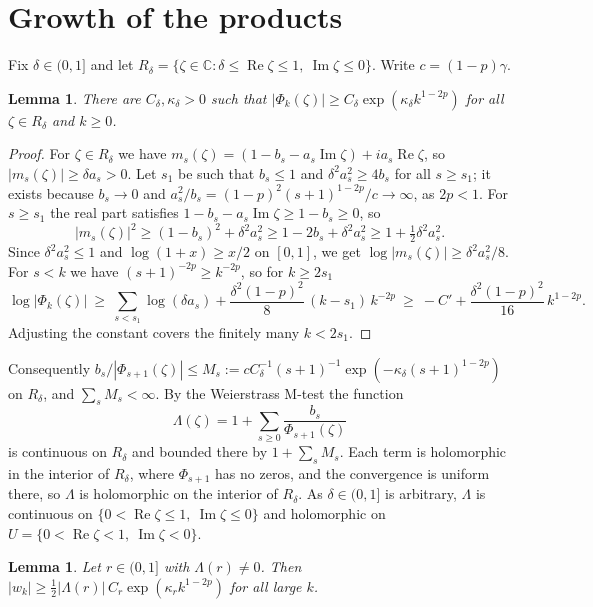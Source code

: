 \documentclass[11pt]{amsart}
\newtheorem{lemma}[theorem]{Lemma}
\theoremstyle{remark}
\newcommand{\C}{\mathbb{C}}
\newcommand{\re}{\operatorname{Re}}
\newcommand{\im}{\operatorname{Im}}
\begin{document}
\section{Growth of the products}

Fix $\delta\in(0,1]$ and let $R_\delta=\{\zeta\in\C:\delta\le\re\zeta\le1,\ \im\zeta\le0\}$.
Write $c=(1-p)\gamma$.

\begin{lemma}\label{lem:growth}
There are $C_\delta,\kappa_\delta>0$ such that $|\Phi_k(\zeta)|\ge C_\delta\exp(\kappa_\delta k^{1-2p})$ for all $\zeta\in R_\delta$ and $k\ge0$.
\end{lemma}

\begin{proof}
For $\zeta\in R_\delta$ we have $m_s(\zeta)=(1-b_s-a_s\im\zeta)+ia_s\re\zeta$, so $|m_s(\zeta)|\ge\delta a_s>0$.
Let $s_1$ be such that $b_s\le1$ and $\delta^2a_s^2\ge4b_s$ for all $s\ge s_1$; it exists because $b_s\to0$ and $a_s^2/b_s=(1-p)^2(s+1)^{1-2p}/c\to\infty$, as $2p<1$.
For $s\ge s_1$ the real part satisfies $1-b_s-a_s\im\zeta\ge1-b_s\ge0$, so
\[
|m_s(\zeta)|^2\ge(1-b_s)^2+\delta^2a_s^2\ge1-2b_s+\delta^2a_s^2\ge1+\tfrac12\delta^2a_s^2 .
\]
Since $\delta^2a_s^2\le1$ and $\log(1+x)\ge x/2$ on $[0,1]$, we get $\log|m_s(\zeta)|\ge\delta^2a_s^2/8$.
For $s<k$ we have $(s+1)^{-2p}\ge k^{-2p}$, so for $k\ge 2s_1$
\[
\log|\Phi_k(\zeta)|\ \ge\ \sum_{s<s_1}\log(\delta a_s)+\frac{\delta^2(1-p)^2}{8}\,(k-s_1)\,k^{-2p}
\ \ge\ -C'+\frac{\delta^2(1-p)^2}{16}\,k^{1-2p}.
\]
Adjusting the constant covers the finitely many $k<2s_1$.
\end{proof}

Consequently $b_s/|\Phi_{s+1}(\zeta)|\le M_s:=cC_\delta^{-1}(s+1)^{-1}\exp(-\kappa_\delta(s+1)^{1-2p})$ on $R_\delta$, and $\sum_sM_s<\infty$.
By the Weierstrass M-test the function
\begin{equation}\label{eq:Lambda}
\Lambda(\zeta)=1+\sum_{s\ge0}\frac{b_s}{\Phi_{s+1}(\zeta)}
\end{equation}
is continuous on $R_\delta$ and bounded there by $1+\sum_sM_s$.
Each term is holomorphic in the interior of $R_\delta$, where $\Phi_{s+1}$ has no zeros, and the convergence is uniform there, so $\Lambda$ is holomorphic on the interior of $R_\delta$.
As $\delta\in(0,1]$ is arbitrary, $\Lambda$ is continuous on $\{0<\re\zeta\le1,\ \im\zeta\le0\}$ and holomorphic on $U=\{0<\re\zeta<1,\ \im\zeta<0\}$.

\begin{lemma}\label{lem:dichotomy}
Let $r\in(0,1]$ with $\Lambda(r)\neq0$.
Then $|w_k|\ge\frac12|\Lambda(r)|\,C_r\exp(\kappa_r k^{1-2p})$ for all large $k$.
\end{lemma}
\end{document}
